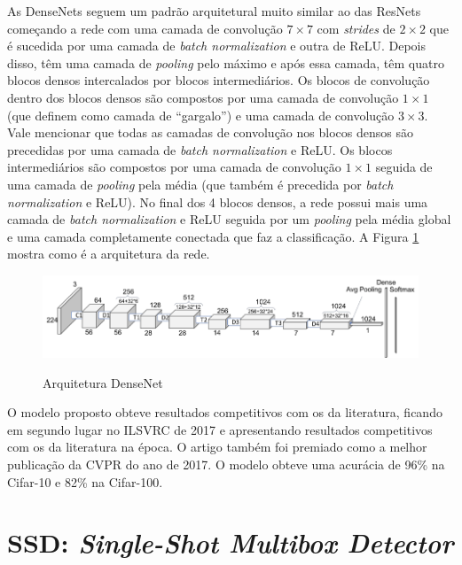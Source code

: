 As \ac{DenseNet}s seguem um padrão arquitetural muito similar ao das \ac{ResNet}s começando a rede com uma camada de convolução $7\times7$ com \textit{strides} de $2\times2$ que é sucedida por uma camada de \textit{batch normalization} e outra de \ac{ReLU}. Depois disso, têm uma camada de \textit{pooling} pelo máximo e após essa camada, têm quatro blocos densos intercalados por blocos intermediários. Os blocos de convolução dentro dos blocos densos são compostos por uma camada de convolução $1\times1$ (que  definem como camada de ``gargalo'') e uma camada de convolução $3\times3$. Vale mencionar que todas as camadas de convolução nos blocos densos são precedidas por uma camada de \textit{batch normalization} e \ac{ReLU}. Os blocos intermediários são compostos por uma camada de convolução $1\times1$ seguida de uma camada de \textit{pooling} pela média (que também é precedida por \textit{batch normalization} e \ac{ReLU}). No final dos 4 blocos densos, a rede possui mais uma camada de \textit{batch normalization} e \ac{ReLU} seguida por um \textit{pooling} pela média global e uma camada completamente conectada que faz a classificação. A Figura \ref{fig:archdensenet} mostra como é a arquitetura da rede.

\begin{figure}[H]
	\setlength{\abovecaptionskip}{0pt}
	\setlength{\belowcaptionskip}{0pt}
	\caption[Arquitetura DenseNet]{Arquitetura DenseNet}
	\centering
	\includegraphics[width=.7\textwidth]{imagem/0x_densenet_arch.png}
	\captionsetup{justification=centering}
	\label{fig:archdensenet}
\end{figure}

O modelo proposto obteve resultados competitivos com os da literatura, ficando em segundo lugar no \ac{ILSVRC} de 2017 e apresentando resultados competitivos com os da literatura na época. O artigo também foi premiado como a melhor publicação da \ac{CVPR} do ano de 2017. O modelo obteve uma acurácia de 96\% na Cifar-10 e 82\% na Cifar-100.

\section{SSD: \textit{Single-Shot Multibox Detector}}
\label{secao:3:2}

